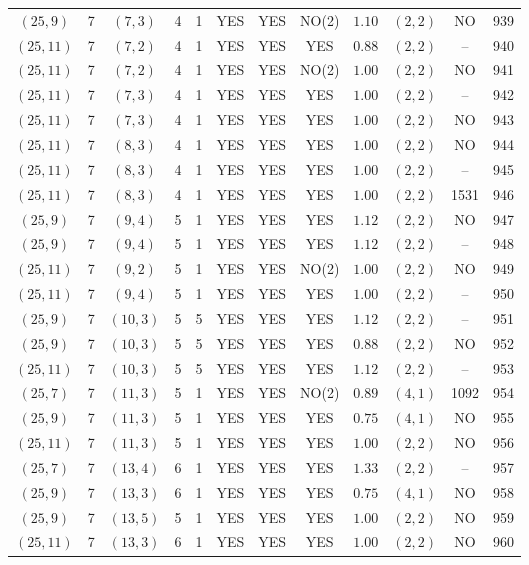 \begin{longtable}{|c|c|c|c|c|c|c|c|c|c|c|c|}
$(25,9)$ & 7 & $(7,3)$ & 4 & 1 & YES & YES & NO(2) & $1.10$ & $(2,2)$ & NO & 939\\
$(25,11)$ & 7 & $(7,2)$ & 4 & 1 & YES & YES & YES & $0.88$ & $(2,2)$ & -- & 940\\
$(25,11)$ & 7 & $(7,2)$ & 4 & 1 & YES & YES & NO(2) & $1.00$ & $(2,2)$ & NO & 941\\
$(25,11)$ & 7 & $(7,3)$ & 4 & 1 & YES & YES & YES & $1.00$ & $(2,2)$ & -- & 942\\
$(25,11)$ & 7 & $(7,3)$ & 4 & 1 & YES & YES & YES & $1.00$ & $(2,2)$ & NO & 943\\
$(25,11)$ & 7 & $(8,3)$ & 4 & 1 & YES & YES & YES & $1.00$ & $(2,2)$ & NO & 944\\
$(25,11)$ & 7 & $(8,3)$ & 4 & 1 & YES & YES & YES & $1.00$ & $(2,2)$ & -- & 945\\
$(25,11)$ & 7 & $(8,3)$ & 4 & 1 & YES & YES & YES & $1.00$ & $(2,2)$ & 1531 & 946\\
$(25,9)$ & 7 & $(9,4)$ & 5 & 1 & YES & YES & YES & $1.12$ & $(2,2)$ & NO & 947\\
$(25,9)$ & 7 & $(9,4)$ & 5 & 1 & YES & YES & YES & $1.12$ & $(2,2)$ & -- & 948\\
$(25,11)$ & 7 & $(9,2)$ & 5 & 1 & YES & YES & NO(2) & $1.00$ & $(2,2)$ & NO & 949\\
$(25,11)$ & 7 & $(9,4)$ & 5 & 1 & YES & YES & YES & $1.00$ & $(2,2)$ & -- & 950\\
$(25,9)$ & 7 & $(10,3)$ & 5 & 5 & YES & YES & YES & $1.12$ & $(2,2)$ & -- & 951\\
$(25,9)$ & 7 & $(10,3)$ & 5 & 5 & YES & YES & YES & $0.88$ & $(2,2)$ & NO & 952\\
$(25,11)$ & 7 & $(10,3)$ & 5 & 5 & YES & YES & YES & $1.12$ & $(2,2)$ & -- & 953\\
$(25,7)$ & 7 & $(11,3)$ & 5 & 1 & YES & YES & NO(2) & $0.89$ & $(4,1)$ & 1092 & 954\\
$(25,9)$ & 7 & $(11,3)$ & 5 & 1 & YES & YES & YES & $0.75$ & $(4,1)$ & NO & 955\\
$(25,11)$ & 7 & $(11,3)$ & 5 & 1 & YES & YES & YES & $1.00$ & $(2,2)$ & NO & 956\\
$(25,7)$ & 7 & $(13,4)$ & 6 & 1 & YES & YES & YES & $1.33$ & $(2,2)$ & -- & 957\\
$(25,9)$ & 7 & $(13,3)$ & 6 & 1 & YES & YES & YES & $0.75$ & $(4,1)$ & NO & 958\\
$(25,9)$ & 7 & $(13,5)$ & 5 & 1 & YES & YES & YES & $1.00$ & $(2,2)$ & NO & 959\\
$(25,11)$ & 7 & $(13,3)$ & 6 & 1 & YES & YES & YES & $1.00$ & $(2,2)$ & NO & 960\\

\end{longtable}
